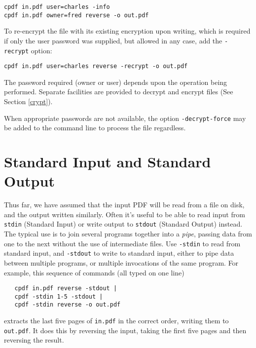 \documentclass{book}
\begin{document}
\begin{framed}
\small\verb!cpdf in.pdf user=charles -info!\\
\indent\small\verb!cpdf in.pdf owner=fred reverse -o out.pdf!
\end{framed}

\noindent To re-encrypt the file with its existing encryption upon writing, which is required if only the user password was supplied, but allowed in any case, add the \texttt{-recrypt} option:

\begin{framed}
\small\verb!cpdf in.pdf user=charles reverse -recrypt -o out.pdf!
\end{framed}

\noindent The password required (owner or user) depends upon the operation
being performed. Separate facilities are provided to decrypt and encrypt files
(See Section \ref{crypt}).

When appropriate passwords are not available, the option \texttt{-decrypt-force} may be added to the command line to process the file regardless.

  \section{Standard Input and Standard Output}
 
  Thus far, we have assumed that the input PDF will be read from a file on
disk, and the output written similarly. Often it's useful to be able to read
input from \texttt{stdin} (Standard Input) or write output to \texttt{stdout}
(Standard Output) instead. The typical use is to join several programs
together into a \textit{pipe}, passing data from one to the next without the
use of intermediate files. Use \texttt{-stdin} to read from standard input, and
\texttt{-stdout} to write to standard input, either to pipe data between
multiple programs, or multiple invocations of the same program. For example, this sequence of commands (all typed on one line)

  \begin{framed}
  \small\begin{verbatim}   cpdf in.pdf reverse -stdout |
   cpdf -stdin 1-5 -stdout |
   cpdf -stdin reverse -o out.pdf\end{verbatim}
  \end{framed}

\noindent extracts the last five pages of \texttt{in.pdf} in the correct order,
writing them to \texttt{out.pdf}. It does this by reversing the input, taking
the first five pages and then reversing the result.
\end{document}

